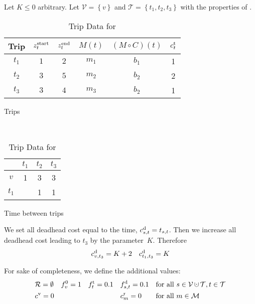 \begin{example}
\label{ex:approximation_factor}

Let $K\leq 0$ arbitrary. Let ${\mathcal{V} = \left\{v\right\}}$ and ${\mathcal{T} = \left\{t_1,t_2,t_3\right\}}$ with the properties of . 

\begin{table}[htp]
	\centering
	\begin{subtable}[h]{.6\textwidth}
		\centering
		\begin{tabular}{c|ccccc}
			Trip & $z^{\operatorname{start}}_t$ & $z^{\operatorname{end}}_t$ & $M(t)$ & $\left(M\circ C\right)(t)$ & $c^{\operatorname{t}}_t$ \\
			\hline
			$t_1$ & $1$ & $2$ & $m_1$ & $b_1$ & 1 \\
			$t_2$ & $3$ & $5$ & $m_2$ & $b_2$ & 2 \\
			$t_3$ & $3$ & $4$ & $m_3$ & $b_2$ & 1 \\
		\end{tabular}
		\caption{Trips}
	\end{subtable}
	~
	\begin{subtable}[h]{.3\textwidth}
		\centering
		\begin{tabular}{c|ccc}
			& $t_1$ & $t_2$ & $t_3$ \\
			\hline
			$v$   & 1 & 3 & 3 \\
			$t_1$ &   & 1 & 1 \\
		\end{tabular}
		\caption{Time between trips}
	\end{subtable}
	\caption{Trip Data for }
	\label{tab:approximation_example}
\end{table}

We set all deadhead cost equal to the time, \ie ${c^{\operatorname{d}}_{s,t}=t_{s,t}}$. Then we increase all deadhead cost leading to $t_3$ by the parameter~$K$. Therefore
\begin{align*}
	c^{\operatorname{d}}_{v,t_3} = K+2 && c^{\operatorname{d}}_{t_1,t_3} = K
\end{align*}

For sake of completeness, we define the additional values:
\begin{align*}
	& \mathcal{R}=\emptyset && f^0_v=1 && \ft_t=0.1 && \fd_{s,t}=0.1 && \text{for all } s\in\mathcal{V}\cupdot\mathcal{T}, t\in\mathcal{T} \\
	& \cv = 0 &&&&&& \croute_m=0 && \text{for all } m\in\mathcal{M} \\
\end{align*}


\end{example}
